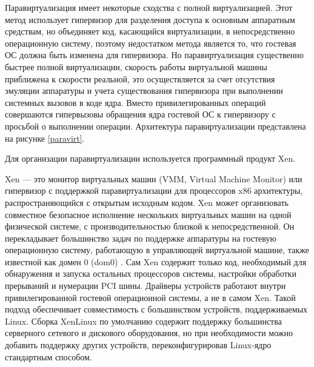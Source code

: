Паравиртуализация имеет некоторые сходства с полной виртуализацией.
Этот метод использует гипервизор для разделения доступа к основным аппаратным средствам, но объединяет код, касающийся виртуализации, в непосредственно операционную систему, поэтому недостатком метода является то, что гостевая ОС должна быть изменена для гипервизора.
Но паравиртуализация существенно быстрее полной виртуализации, скорость работы виртуальной машины приближена к скорости реальной, это осуществляется за счет отсутствия эмуляции аппаратуры и учета существования гипервизора при выполнении системных вызовов в коде ядра.
Вместо привилегированных операций совершаются гипервызовы обращения ядра гостевой ОС к гипервизору с просьбой о выполнении операции.
Архитектура паравиртуализации представлена на рисунке \ref{paravirt}.

Для организации паравиртуализации используется программный продукт Xen.

Xen --- это монитор виртуальных машин (VMM, Virtual Machine Monitor) или гипервизор с поддержкой паравиртуализации для процессоров x86 архитектуры, распространяющийся с открытым исходным кодом.
Xen может организовать совместное безопасное исполнение нескольких виртуальных машин на одной физической системе, с производительностью близкой к непосредственной.
Он перекладывает большинство задач по поддержке аппаратуры на гостевую операционную систему, работающую в управляющей виртуальной машине, также известной как домен 0 (dom0) \cite{xen-xguru}.
Сам Xen содержит только код, необходимый для обнаружения и запуска остальных процессоров системы, настройки обработки прерываний и нумерации PCI шины.
Драйверы устройств работают внутри привилегированной гостевой операционной системы, а не в самом Xen.
Такой подход обеспечивает совместимость с большинством устройств, поддерживаемых Linux.
Сборка XenLinux по умолчанию содержит поддержку большинства серверного сетевого и дискового оборудования, но при необходимости можно добавить поддержку других устройств, переконфигурировав Linux-ядро стандартным способом.

